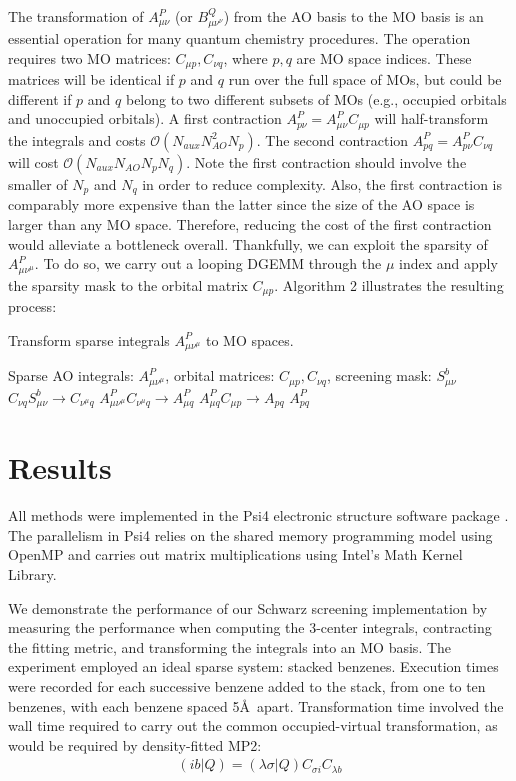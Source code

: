 The transformation of $A_{\mu \nu}^P$ (or $B_{\mu \nu^\nu}^Q$) from the AO basis to the MO basis is 
an essential operation for many quantum 
chemistry procedures. The operation requires two MO matrices: $C_{\mu p}, C_{\nu q}$, where $p, q$ are MO space
indices. These matrices will be identical if $p$ and $q$ run over the full space of MOs, but could be different if $p$ and $q$
belong to two different subsets of MOs (e.g., occupied orbitals and unoccupied orbitals).
A first contraction $A_{p \nu}^P=A_{\mu \nu}^PC_{\mu p}$ will half-transform the integrals and costs 
$\mathcal{O}(N_{aux}N_{AO}^2N_p)$. The second contraction $A_{p q}^P=A_{p \nu}^PC_{\nu q}$ will cost
$\mathcal{O}(N_{aux}N_{AO}N_pN_q)$.
Note the first contraction should involve the smaller of $N_p$ and $N_q$ in order to reduce complexity. Also, the first contraction
is comparably more expensive than the latter since the size of the AO space is larger than any MO space. Therefore,
reducing the cost of the first contraction would alleviate a bottleneck overall. 
Thankfully, we can exploit the sparsity of $A_{\mu \nu^\mu}^P$.
To do so, we carry out a looping DGEMM through the $\mu$ index and apply the sparsity mask to the orbital matrix $C_{\mu p}$.
Algorithm 2 illustrates the resulting process:

\begin{algorithm}[H]
\caption{Transform sparse integrals $A_{\mu \nu^\mu}^P$ to MO spaces.}
\begin{algorithmic}
\REQUIRE Sparse AO integrals: $A_{\mu \nu^\mu}^P$, orbital matrices: $C_{\mu p}, C_{\nu q}$, screening mask: $S_{\mu \nu}^b$
    \STATE $C_{\nu q}S_{\mu \nu}^b \rightarrow C_{\nu^{\mu} q}$
    \STATE $A_{\mu \nu^{\mu}}^P C_{\nu^{\mu} q} \rightarrow A_{\mu q}^P$
\ENDFOR
\STATE $A_{\mu q}^PC_{\mu p} \rightarrow A_{p q}$
\RETURN $A_{p q}^P$
\end{algorithmic}
\end{algorithm}


\section{Results}

All methods were implemented in the {\sc Psi4} electronic structure software package \cite{Parrish:2017:3185}.
The parallelism in {\sc Psi4} relies on the shared memory programming model using OpenMP 
and carries out matrix multiplications using Intel's Math Kernel
Library. 

We demonstrate the performance of our Schwarz screening implementation 
by measuring the performance when computing the 3-center integrals, contracting the fitting metric,
and transforming the integrals into an MO basis.
The experiment employed an ideal sparse system: stacked benzenes. Execution times were recorded for each successive benzene
added to the stack, from one to ten benzenes, with each benzene spaced 5\AA\ apart.
Transformation time involved the wall time required to carry out the common occupied-virtual
transformation, as would be required by density-fitted MP2: 
\begin{align} 
(i b | Q) = (\lambda \sigma | Q) C_{\sigma i} C_{\lambda b} 
\end{align}

